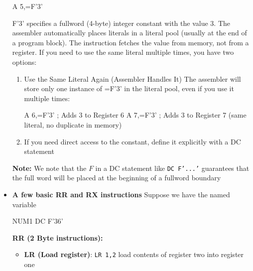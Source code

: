 \documentclass{report}
\begin{document}
\begin{itemize}
                    \bigbreak \noindent 
                    \begin{cppcode}
                    A 5,=F'3'
                    \end{cppcode}
                    \bigbreak \noindent 
                    F'3' specifies a fullword (4-byte) integer constant with the value 3. The assembler automatically places literals in a literal pool (usually at the end of a program block). The instruction fetches the value from memory, not from a register.
                    \bigbreak \noindent 
                    If you need to use the same literal multiple times, you have two options:
                    \begin{enumerate}
                        \item Use the Same Literal Again (Assembler Handles It) The assembler will store only one instance of =F'3' in the literal pool, even if you use it multiple times:
                            \bigbreak \noindent 
                            \begin{cppcode}
                                A 6,=F'3'   ; Adds 3 to Register 6
                                A 7,=F'3'   ; Adds 3 to Register 7 (same literal, no duplicate in memory)
                            \end{cppcode}
                            \bigbreak \noindent 
                        \item If you need direct access to the constant, define it explicitly with a DC statement
                    \end{enumerate}
                    \bigbreak \noindent 
                    \textbf{Note:} We note that the $F$ in a DC statement like \texttt{DC F'...'} guarantees that the full word will be placed at the beginning of a fullword boundary
                \item \textbf{A few basic RR and RX instructions}
                    \bigbreak \noindent 
                    Suppose we have the named variable
                    \bigbreak \noindent 
                    \begin{cppcode}
                    NUM1    DC F'36'
                    \end{cppcode}
                    \bigbreak \noindent 
                    \textbf{RR (2 Byte instructions):}
                    \begin{itemize}
                        \item \textbf{LR (Load register)}: \texttt{LR 1,2} load contents of register two into register one

\end{itemize}
\end{itemize}
\end{document}
